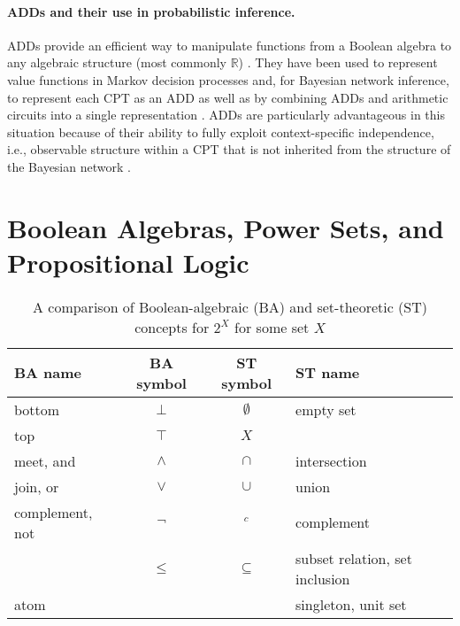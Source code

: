 \documentclass{article}
\theoremstyle{definition}
\theoremstyle{remark}
\begin{document}
\paragraph{ADDs and their use in probabilistic inference.} ADDs provide an
efficient way to manipulate functions from a Boolean algebra to any algebraic
structure (most commonly $\mathbb{R}$) \cite{DBLP:journals/fmsd/BaharFGHMPS97}.
They have been used to represent value functions in Markov decision processes
\cite{DBLP:conf/uai/HoeySHB99} and, for Bayesian network inference, to represent
each CPT as an ADD \cite{DBLP:conf/icml/ZhaoMP15} as well as by combining ADDs
and arithmetic circuits into a  single representation
\cite{DBLP:conf/ijcai/ChaviraD07}. ADDs are particularly advantageous in this
situation because of their ability to fully exploit context-specific
independence, i.e., observable structure within a CPT that is not inherited from
the structure of the Bayesian network \cite{DBLP:conf/uai/BoutilierFGK96}.

\section{Boolean Algebras, Power Sets, and Propositional
  Logic} \label{sec:prelims}

\begin{table}
  \centering
  \caption{A comparison of Boolean-algebraic (BA) and set-theoretic (ST)
    concepts for $2^X$ for some set $X$}
  \label{tbl:notation}
  \begin{tabular}{lccl}
    \toprule
    BA name & BA symbol & ST symbol & ST name \\
    \midrule
    bottom & $\bot$ & $\emptyset$ & empty set \\
    top & $\top$ & $X$ & \\
    meet, and & $\land$ & $\cap$ & intersection \\
    join, or & $\lor$ & $\cup$ & union \\
    complement, not & $\neg$ & $^c$ & complement \\
            & $\le$ & $\subseteq$ & subset relation, set inclusion \\
    atom & & & singleton, unit set \\
    \bottomrule
  \end{tabular}
\end{table}
\end{document}
